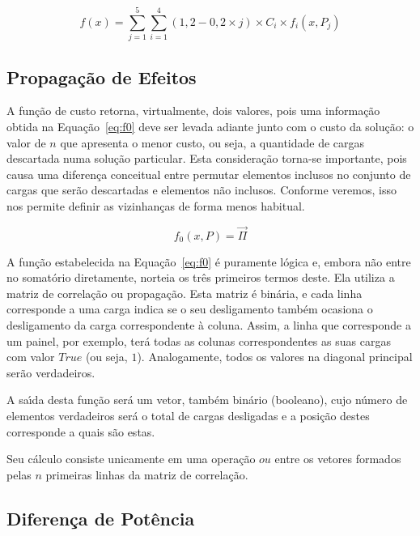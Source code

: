 \begin{equation} \label{eq:pond}
	f\left( x \right) = \sum_{j=1}^{5}{\sum_{i=1}^{4}{\left(1,2-0,2\times j\right) \times C_{i} \times f_{i} \left( x, P_{j} \right)}}
\end{equation}

\subsection{Propaga{\c c}{\~a}o de Efeitos} \label{subsec:f0}

A fun{\c c}{\~a}o de custo retorna, virtualmente, dois valores, pois uma informa{\c c}{\~a}o obtida na Equa{\c c}{\~a}o~\ref{eq:f0} deve ser levada adiante junto com o custo da solu{\c c}{\~a}o: o valor de $n$ que apresenta o menor custo, ou seja, a quantidade de cargas descartada numa solu{\c c}{\~a}o particular. Esta considera{\c c}{\~a}o torna-se importante, pois causa uma diferen{\c c}a conceitual entre permutar elementos inclusos no conjunto de cargas que ser{\~a}o descartadas e elementos n{\~a}o inclusos. Conforme veremos, isso nos permite definir as vizinhan{\c c}as de forma menos habitual.

\begin{equation} \label{eq:f0}
	f_{0} \left( x, P \right) = \vec{\Pi}
\end{equation}

A fun{\c c}{\~a}o estabelecida na Equa{\c c}{\~a}o~\ref{eq:f0} {\'e} puramente l{\'o}gica e, embora n{\~a}o entre no somat{\'o}rio diretamente, norteia os tr{\^e}s primeiros termos deste. Ela utiliza a matriz de correla{\c c}{\~a}o ou propaga{\c c}{\~a}o. Esta matriz {\'e} bin{\'a}ria, e cada linha corresponde a uma carga indica se o seu desligamento tamb{\'e}m ocasiona o desligamento da carga correspondente {\`a} coluna. Assim, a linha que corresponde a um painel, por exemplo, ter{\'a} todas as colunas correspondentes as suas cargas com valor $True$ (ou seja, $1$). Analogamente, todos os valores na diagonal principal ser{\~a}o verdadeiros.

A sa{\'\i}da desta fun{\c c}{\~a}o ser{\'a} um vetor, tamb{\'e}m bin{\'a}rio (booleano), cujo n{\'u}mero de elementos verdadeiros ser{\'a} o total de cargas desligadas e a posi{\c c}{\~a}o destes corresponde a quais s{\~a}o estas.

Seu c{\'a}lculo consiste unicamente em uma opera{\c c}{\~a}o $ou$ entre os vetores formados pelas $n$ primeiras linhas da matriz de correla{\c c}{\~a}o.

\subsection{Diferen{\c c}a de Pot{\^e}ncia} \label{subsec:f1}

